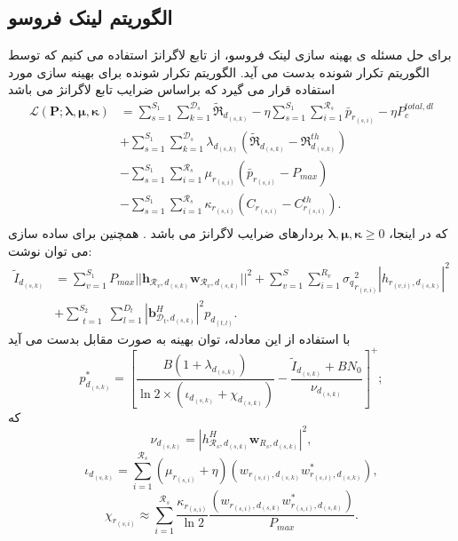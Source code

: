 \subsection{الگوریتم لینک فروسو}
برای حل مسئله ی بهینه سازی لینک فروسو، از تابع لاگرانژ استفاده می کنیم \cite{boyd} که توسط الگوریتم تکرار شونده بدست می آید. 
الگوریتم تکرار شونده برای بهینه سازی مورد استفاده قرار می گیرد که براساس ضرایب تابع لاگرانژ می باشد 
\begin{equation}
\begin{split}
\mathcal{L}(\boldsymbol{P}; \boldsymbol{\lambda}, \boldsymbol{\mu}, \boldsymbol{ \kappa}) & = \sum\limits_{s=1}^{S_1} \sum\limits_{k=1}^{\mathcal{D}_s}\mathfrak{\tilde{R}}_{d_{(s,k)}} 
- \eta \sum\limits_{s=1}^{S_1} \sum\limits_{i=1}^{\mathcal{R}_s}\bar{p}_{r_{(s,i)}} - \eta P_c^{total, dl}\\
&+\sum\limits_{s=1}^{S_1} \sum\limits_{k=1}^{\mathcal{D}_s} \lambda_{d_{(s,k)}} (\mathfrak{\tilde{R}}_{d_{(s,k)}}-\mathfrak{R}_{d_{(s,k)}}^{th})\\
&- \sum\limits_{s=1}^{S_1} \sum\limits_{i=1}^{\mathcal{R}_s} \mu_{r_{(s,i)}} (\bar{p}_{r_{(s,i)}}-P_{max})\\
&- \sum\limits_{s=1}^{S_1} \sum\limits_{i=1}^{\mathcal{R}_s} \kappa_{r_{(s,i)}} (C_{r_{(s,i)}}-C_{r_{(s,i)}}^{th}).\\
\end{split}
\end{equation}
که در اینجا، $\boldsymbol{\lambda}, \boldsymbol{\mu}, \boldsymbol{\kappa} \geq 0$
بردارهای ضرایب لاگرانژ می باشد .\newline
همچنین برای ساده سازی می توان نوشت:
\begin{equation}
\begin{split}
\tilde{I}_{d_{(s,k)}} &= \sum_{v=1}^{S_1} P_{max}|| \boldsymbol{h}_{\mathcal{R}_v,d_{(s,k)}} \boldsymbol{w}_{\mathcal{R}_v,d_{(s,k)}}||^2  +  \sum_{v=1}^{S} \sum_{i=1}^{{R}_v} {\sigma_q}_{r_{(v,i)}}^2  |h_{r_{(v,i)}, d_{(s,k)}}|^2 \\
&+ \sum_{\substack{t=1}}^{S_2} \sum_{l=1}^{{D}_t} |\boldsymbol{b}_{\mathcal{D}_t, d_{(s,k)}}^H|^2  p_{d_{(t,l)}}.
\end{split}
\end{equation}
با استفاده از این معادله، توان بهینه به صورت مقابل بدست می آید
\begin{equation}
p_{d_{(s,k)}}^* =[\frac{ B(1+\lambda_{d_{(s,k)}} )}{\ln2 \times (\iota_{d_{(s,k)}}+ \chi_{d_{(s,k)}})} -\frac{\tilde{I}_{d_{(s,k)}} + BN_0}{\nu_{d_{(s,k)}} }]^+;
\end{equation} 
که 
 $$\nu_{d_{(s,k)}} =|h_{\mathcal{R}_s, d_{(s,k)}}^H \boldsymbol{w}_{R_{s},d_{(s,k)}}|^2,$$
 $$\iota_{d_{(s,k)}}= \sum\limits_{i=1}^{\mathcal{R}_s} (\mu_{r_{(s,i)}}+\eta)(w_{r_{(s,i)},d_{(s,k)}} w_{r_{(s,i)},d_{(s,k)}}^*),$$
 $$\chi_{r_{(s,i)}} \approx  \sum\limits_{i=1}^{\mathcal{R}_s} \frac{\kappa_{r_{(s,i)}}}{\ln 2}\frac{(w_{r_{(s,i)},d_{(s,k)}} w_{r_{(s,i)},d_{(s,k)}}^*)}{ P_{max}}.$$
